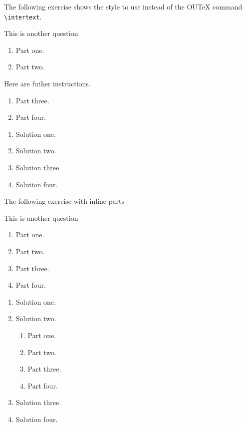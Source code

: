 \documentclass[solutionsatend]{ouunit}
\begin{document}
The following exercise shows the style to use instead of the OUTeX command \verb”\intertext”.
\begin{exercise}\label{exe-intertext}
This is another question
\begin{enumerate}
\item Part one.
\item Part two.
\end{enumerate}
Here are futher instructions.
\begin{enumerate}[resume]
\item Part three.
\item Part four.
\end{enumerate}
\begin{solution}
\begin{enumerate}
\item Solution one.
\item Solution two.
\item Solution three.
\item Solution four.
\end{enumerate}
\end{solution}
\end{exercise}

\makeatletter
%
\makeatother

The following exercise with inline parts
\begin{exercise}\label{exe-intertext2}
This is another question
\begin{enumerate}
\item Part one.
\item Part two.
\item Part three.
\item Part four.
\end{enumerate}
\begin{solution}
\begin{enumerate}
\item Solution one.
\item Solution two.
\begin{enumerate}
\item Part one.
\item Part two.
\item Part three.
\item Part four.
\end{enumerate}
\item Solution three.
\item Solution four.
\end{enumerate}
\end{solution}
\end{exercise}
\end{document}
